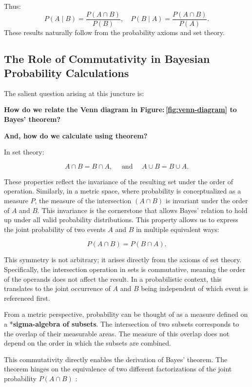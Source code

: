 \documentclass[
  12 pt,
  a4paper,
]{book}
\numberwithin{equation}{section}
\theoremstyle{plain}      %
\theoremstyle{definition} %
\theoremstyle{remark}     %
\theoremstyle{note}         %
\begin{document}
Thus: \[
P(A \mid B) = \frac{P(A \cap B)}{P(B)}, \quad P(B \mid A) = \frac{P(A \cap B)}{P(A)}.
\] These results naturally follow from the probability axioms and set
theory.

\newpage

\hypertarget{the-role-of-commutativity-in-bayesian-probability-calculations}{%
\subsection{The Role of Commutativity in Bayesian Probability
Calculations}\label{the-role-of-commutativity-in-bayesian-probability-calculations}}

The salient question arising at this juncture is:

\textbf{How do we relate the Venn diagram in
Figure:\(\,\)\ref{fig:venn-diagram} to Bayes' theorem?}

\textbf{And, how do we calculate using theorem?}

In set theory:

\[
A \cap B=B \cap A, \quad \text { and } \quad A \cup B=B \cup A .
\]

These properties reflect the invariance of the resulting set under the
order of operation. Similarly, in a metric space, where probability is
conceptualized as a measure \(P\), the measure of the intersection
\((A \cap B)\) is invariant under the order of \(A\) and \(B\). This
invariance is the cornerstone that allows Bayes' relation to hold up
under all valid probability distributions. This property allows us to
express the joint probability of two events \(A\) and \(B\) in multiple
equivalent ways:

\[
P(A \cap B)=P(B \cap A) .
\]

This symmetry is not arbitrary; it arises directly from the axioms of
set theory. Specifically, the intersection operation in sets is
commutative, meaning the order of the operands does not affect the
result. In a probabilistic context, this translates to the joint
occurrence of \(A\) and \(B\) being independent of which event is
referenced first.

From a metric perspective, probability can be thought of as a measure
defined on a *\textbf{sigma-algebra of subsets}. The intersection of two
subsets corresponds to the overlap of their measurable areas. The
measure of this overlap does not depend on the order in which the
subsets are combined.

This commutativity directly enables the derivation of Bayes' theorem.
The theorem hinges on the equivalence of two different factorizations of
the joint probability \(P(A \cap B)\) :
\end{document}
